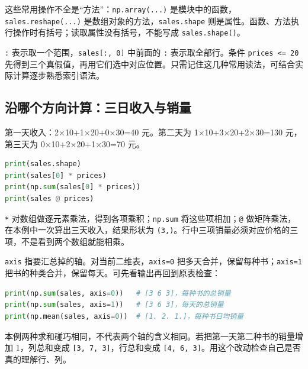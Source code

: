 \documentclass[UTF8,a4paper,11pt,fontset=fandol]{ctexart}
\providecommand{\passthrough}[1]{#1}
\begin{document}
这些常用操作不全是``方法''：\passthrough{\lstinline!np.array(...)!} 是模块中的函数，\passthrough{\lstinline!sales.reshape(...)!} 是数组对象的方法，\passthrough{\lstinline!sales.shape!} 则是属性。函数、方法执行操作时有括号；读取属性没有括号，不能写成 \passthrough{\lstinline!sales.shape()!}。

\passthrough{\lstinline!:!} 表示取一个范围，\passthrough{\lstinline!sales[:, 0]!} 中前面的 \passthrough{\lstinline!:!} 表示取全部行。条件 \passthrough{\lstinline!prices <= 20!} 先得到三个真假值，再用它们选中对应位置。只需记住这几种常用读法，可结合实际计算逐步熟悉索引语法。

\clearpage

\subsection{沿哪个方向计算：三日收入与销量}\label{ux6cbfux54eaux4e2aux65b9ux5411ux8ba1ux7b97ux4e09ux65e5ux6536ux5165ux4e0eux9500ux91cf}

第一天收入：2×10+1×20+0×30=40 元。第二天为 1×10+3×20+2×30=130 元，第三天为 0×10+2×20+1×30=70 元。

\begin{lstlisting}[language=Python]
print(sales.shape)
print(sales[0] * prices)
print(np.sum(sales[0] * prices))
print(sales @ prices)
\end{lstlisting}

\passthrough{\lstinline!*!} 对数组做逐元素乘法，得到各项乘积；\passthrough{\lstinline!np.sum!} 将这些项相加；\passthrough{\lstinline!@!} 做矩阵乘法，在本例中一次算出三天收入，结果形状为 \passthrough{\lstinline!(3,)!}。行中三项销量必须对应价格的三项，不是看到两个数组就能相乘。

\passthrough{\lstinline!axis!} 指要汇总掉的轴。对当前二维表，\passthrough{\lstinline!axis=0!} 把多天合并，保留每种书；\passthrough{\lstinline!axis=1!} 把书的种类合并，保留每天。可先看输出再回到原表检查：

\begin{lstlisting}[language=Python]
print(np.sum(sales, axis=0))   # [3 6 3]，每种书的总销量
print(np.sum(sales, axis=1))   # [3 6 3]，每天的总销量
print(np.mean(sales, axis=0))  # [1. 2. 1.]，每种书日均销量
\end{lstlisting}

本例两种求和碰巧相同，不代表两个轴的含义相同。若把第一天第二种书的销量增加 1，列总和变成 \passthrough{\lstinline![3, 7, 3]!}，行总和变成 \passthrough{\lstinline![4, 6, 3]!}。用这个改动检查自己是否真的理解行、列。
\end{document}
